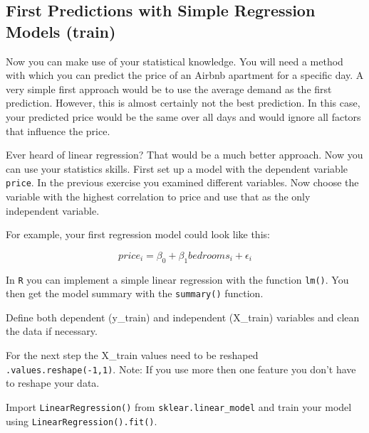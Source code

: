 \documentclass[
  11pt,
]{article}
\newenvironment{tips}[1]
  {
  \begin{itemize}
  \footnotesize
  \renewcommand{\labelitemi}{
    \raisebox{-.7\height}[0pt][0pt]{
      {\setkeys{Gin}{width=3em,keepaspectratio}
        \texttt{[image: images/\#1.png]}}
    }
  }
  \setlength{\fboxsep}{1em}
  \begin{rbox}
  \item
  }
  {
  \end{rbox}
  \end{itemize}
  }
\newenvironment{tipsp}[1]
  {
  \begin{itemize}
  \footnotesize
  \renewcommand{\labelitemi}{
    \raisebox{-.7\height}[0pt][0pt]{
      {\setkeys{Gin}{width=3em,keepaspectratio}
        \texttt{[image: images/\#1.png]}}
    }
  }
  \setlength{\fboxsep}{1em}
  \begin{pbox}
  \item
  }
  {
  \end{pbox}
  \end{itemize}
  }
\begin{document}
\hypertarget{first-predictions-with-simple-regression-models-train}{%
\subsection{First Predictions with Simple Regression Models (train)}\label{first-predictions-with-simple-regression-models-train}}

Now you can make use of your statistical knowledge. You will need a method with which you can predict the price of an Airbnb apartment for a specific day. A very simple first approach would be to use the average demand as the first prediction. However, this is almost certainly not the best prediction. In this case, your predicted price would be the same over all days and would ignore all factors that influence the price.

Ever heard of linear regression? That would be a much better approach. Now you can use your statistics skills. First set up a model with the dependent variable \texttt{price}. In the previous exercise you examined different variables. Now choose the variable with the highest correlation to price and use that as the only independent variable.

For example, your first regression model could look like this:

\[price_i = \beta_0 + \beta_1 bedrooms_i + \epsilon_i\]

\begin{tips}r
In \texttt{R} you can implement a simple linear regression with the function \texttt{lm()}. You then get the model summary with the \texttt{summary()} function.

\end{tips}

\begin{tipsp}p
Define both dependent (y\_train) and independent (X\_train) variables and clean the data if necessary.

For the next step the X\_train values need to be reshaped \texttt{.values.reshape(-1,1)}.
Note: If you use more then one feature you don't have to reshape your data.

Import \texttt{LinearRegression()} from \texttt{sklear.linear\_model} and train your model using \texttt{LinearRegression().fit()}.

\end{tipsp}
\end{document}
